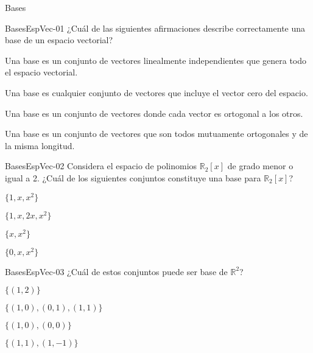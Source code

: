\documentclass[a4,11pt]{aleph-notas}
\begin{document}
\begin{quiz}{Bases}

\begin{multi}[]%
    {BasesEspVec-01}
    ¿Cuál de las siguientes afirmaciones describe correctamente una base de un espacio vectorial?
    \item* Una base es un conjunto de vectores linealmente independientes que genera todo el espacio vectorial.
    \item Una base es cualquier conjunto de vectores que incluye el vector cero del espacio.
    \item Una base es un conjunto de vectores donde cada vector es ortogonal a los otros.
    \item Una base es un conjunto de vectores que son todos mutuamente ortogonales y de la misma longitud.
\end{multi}

\begin{multi}[]%
    {BasesEspVec-02}
    Considera el espacio de polinomios \( \mathbb{R}_2[x] \) de grado menor o igual a 2. ¿Cuál de los siguientes conjuntos constituye una base para \( \mathbb{R}_2[x] \)?
    \item* $\{1, x, x^2\}$
    \item $\{1, x, 2x, x^2\}$
    \item $\{x, x^2\}$
    \item $\{0, x, x^2\}$
\end{multi}

\begin{multi}[]%
    {BasesEspVec-03}
    ¿Cuál de estos conjuntos puede ser base de \( \mathbb{R}^2 \)?
    \item $\{(1, 2)\}$
    \item* $\{(1, 0), (0, 1), (1, 1)\}$
    \item $\{(1, 0), (0, 0)\}$
    \item $\{(1, 1), (1, -1)\}$
\end{multi}


\end{quiz}
\end{document}
